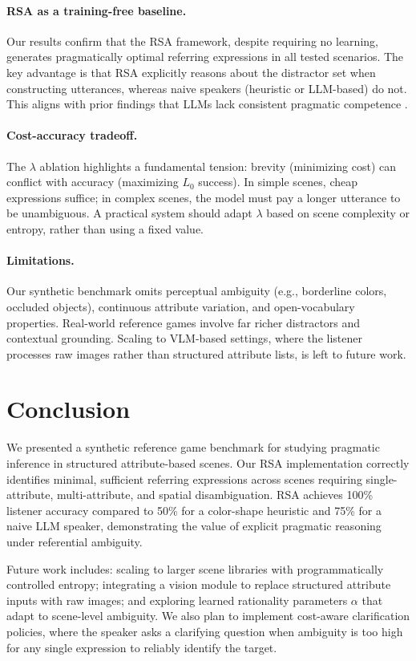 \documentclass[10pt]{article}
\begin{document}
\paragraph{RSA as a training-free baseline.} Our results confirm that the RSA framework, despite requiring no learning, generates pragmatically optimal referring expressions in all tested scenarios. The key advantage is that RSA explicitly reasons about the distractor set when constructing utterances, whereas naive speakers (heuristic or LLM-based) do not. This aligns with prior findings that LLMs lack consistent pragmatic competence \cite{jian2024llmpragmatic, ma2025vision}.

\paragraph{Cost-accuracy tradeoff.} The $\lambda$ ablation highlights a fundamental tension: brevity (minimizing cost) can conflict with accuracy (maximizing $L_0$ success). In simple scenes, cheap expressions suffice; in complex scenes, the model must pay a longer utterance to be unambiguous. A practical system should adapt $\lambda$ based on scene complexity or entropy, rather than using a fixed value.

\paragraph{Limitations.} Our synthetic benchmark omits perceptual ambiguity (e.g., borderline colors, occluded objects), continuous attribute variation, and open-vocabulary properties. Real-world reference games involve far richer distractors and contextual grounding. Scaling to VLM-based settings, where the listener processes raw images rather than structured attribute lists, is left to future work.

\section{Conclusion}

We presented a synthetic reference game benchmark for studying pragmatic inference in structured attribute-based scenes. Our RSA implementation correctly identifies minimal, sufficient referring expressions across scenes requiring single-attribute, multi-attribute, and spatial disambiguation. RSA achieves 100\% listener accuracy compared to 50\% for a color-shape heuristic and 75\% for a naive LLM speaker, demonstrating the value of explicit pragmatic reasoning under referential ambiguity.

Future work includes: scaling to larger scene libraries with programmatically controlled entropy; integrating a vision module to replace structured attribute inputs with raw images; and exploring learned rationality parameters $\alpha$ that adapt to scene-level ambiguity. We also plan to implement cost-aware clarification policies, where the speaker asks a clarifying question when ambiguity is too high for any single expression to reliably identify the target.



\end{document}
